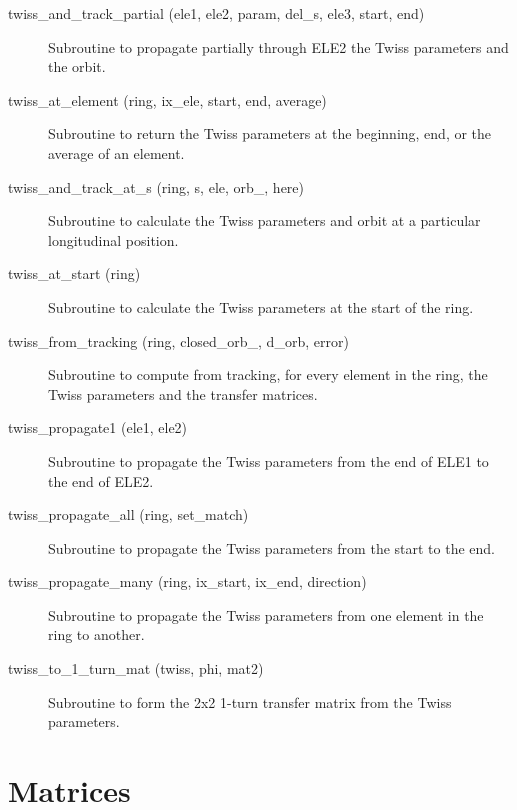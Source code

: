 \begin{description}
\item[twiss\_and\_track\_partial (ele1, ele2, param, del\_s, ele3, start, end)] \Newline
Subroutine to propagate partially through ELE2 the Twiss parameters and the orbit. 

\item[twiss\_at\_element (ring, ix\_ele, start, end, average)] \Newline
Subroutine to return the Twiss parameters at the beginning, end, or the average of an element. 

\item[twiss\_and\_track\_at\_s (ring, s, ele, orb\_, here)] \Newline
Subroutine to calculate the Twiss parameters and orbit at a particular longitudinal position. 

\item[twiss\_at\_start (ring)] \Newline
Subroutine to calculate the Twiss parameters at the start of the ring. 

\item[twiss\_from\_tracking (ring, closed\_orb\_, d\_orb, error)] \Newline
Subroutine to compute from tracking, for every element in the ring, 
the Twiss parameters and the transfer matrices. 

\item[twiss\_propagate1 (ele1, ele2)] \Newline
Subroutine to propagate the Twiss parameters from the end of ELE1 to the end of ELE2. 

\item[twiss\_propagate\_all (ring, set\_match)] \Newline
Subroutine to propagate the Twiss parameters from the start to the end. 

\item[twiss\_propagate\_many (ring, ix\_start, ix\_end, direction)] \Newline
Subroutine to propagate the Twiss parameters from one element in the ring to another. 

\item[twiss\_to\_1\_turn\_mat (twiss, phi, mat2)] \Newline
Subroutine to form the 2x2 1-turn transfer matrix from the Twiss parameters. 

\end{description}

\section{Matrices}
\label{r:mat}

